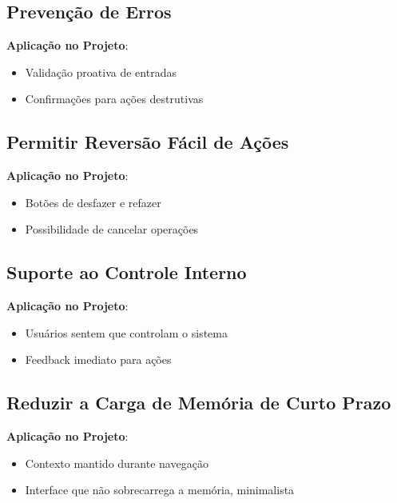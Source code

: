 \subsection{Prevenção de Erros}

\textbf{Aplicação no Projeto}:
\begin{itemize}
    \item Validação proativa de entradas
    \item Confirmações para ações destrutivas
\end{itemize}

\subsection{Permitir Reversão Fácil de Ações}

\textbf{Aplicação no Projeto}:
\begin{itemize}
    \item Botões de desfazer e refazer
    \item Possibilidade de cancelar operações
\end{itemize}

\subsection{Suporte ao Controle Interno}

\textbf{Aplicação no Projeto}:
\begin{itemize}
    \item Usuários sentem que controlam o sistema
    \item Feedback imediato para ações
\end{itemize}

\subsection{Reduzir a Carga de Memória de Curto Prazo}

\textbf{Aplicação no Projeto}:
\begin{itemize}
    \item Contexto mantido durante navegação
    \item Interface que não sobrecarrega a memória, minimalista
\end{itemize}